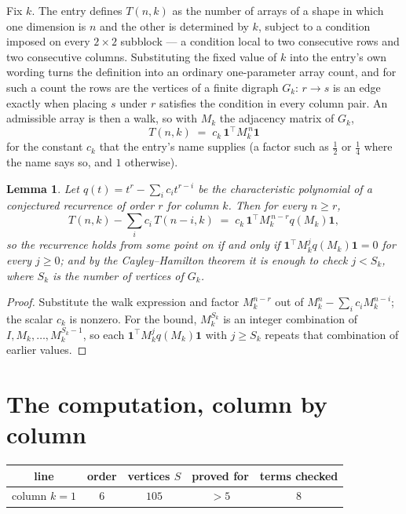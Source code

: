 \documentclass[11pt,a4paper]{article}
\theoremstyle{plain}
\newtheorem{lemma}[theorem]{Lemma}
\theoremstyle{definition}
\begin{document}
Fix $k$. The entry defines $T(n,k)$ as the number of arrays of a shape in which one dimension
is $n$ and the other is determined by $k$, subject to a condition imposed on every
$2\times2$ subblock --- a condition local to two consecutive rows and two consecutive columns.
Substituting the fixed value of $k$ into the entry's own wording turns the definition into an
ordinary one-parameter array count, and for such a count the rows are the vertices of a finite
digraph $G_k$: $r\to s$ is an edge exactly when placing $s$ under $r$ satisfies the condition
in every column pair. An admissible array is then a walk, so with $M_k$ the adjacency matrix
of $G_k$,
\[
T(n,k)\;=\;c_k\,\mathbf{1}^{\!\top}M_k^{\,n}\mathbf{1}
\]
for the constant $c_k$ that the entry's name supplies (a factor such as $\tfrac12$ or
$\tfrac14$ where the name says so, and $1$ otherwise).

\begin{lemma}\label{lem:crit}
Let $q(t)=t^{r}-\sum_i c_it^{r-i}$ be the characteristic polynomial of a conjectured
recurrence of order $r$ for column $k$. Then for every $n\ge r$,
\[
T(n,k)-\sum_i c_i\,T(n-i,k)\;=\;c_k\,\mathbf{1}^{\!\top}M_k^{\,n-r}q(M_k)\mathbf{1},
\]
so the recurrence holds from some point on if and only if
$\mathbf{1}^{\!\top}M_k^{j}q(M_k)\mathbf{1}=0$ for every $j\ge0$; and by the
Cayley--Hamilton theorem it is enough to check $j<S_k$, where $S_k$ is the number of vertices
of $G_k$.
\end{lemma}

\begin{proof}
Substitute the walk expression and factor $M_k^{n-r}$ out of $M_k^{n}-\sum_ic_iM_k^{n-i}$;
the scalar $c_k$ is nonzero. For the bound, $M_k^{S_k}$ is an integer combination of
$I,M_k,\dots,M_k^{S_k-1}$, so each $\mathbf{1}^{\!\top}M_k^{j}q(M_k)\mathbf{1}$ with
$j\ge S_k$ repeats that combination of earlier values.
\end{proof}

\section{The computation, column by column}

\begin{center}
\begin{tabular}{ccccc}
line & order & vertices $S$ & proved for & terms checked \\ \hline
column $k$$=1$ & $6$ & $105$ & $>5$ & $8$ \\
\end{tabular}
\end{center}
\end{document}
